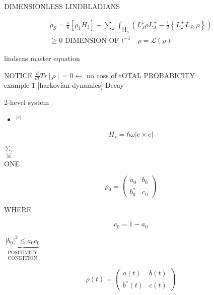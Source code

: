 \documentclass[10pt]{article}
\begin{document}
DIMENSIONLESS LINDBLADIANS

$$
\begin{array}{r}
\dot{\rho}_{S}=\frac{i}{\hbar}\left[\rho_{1} H_{3}\right]+\sum_{J} \int_{\prod_{S}}\left(L_{J}^{\downarrow} \rho L_{J}^{+}-\frac{1}{2}\left\{L_{J}^{+} L_{J}, \rho\right\}\right) \\
\geqslant 0 \text { DIMENSION OF } t^{-1} \quad \rho=\mathcal{L}(\rho)
\end{array}
$$

lindscas master equation

NOTICE $\frac{d}{d t} T r[\rho]=0 \leftarrow$ no coss of tOTAL PROBABICITY\\[0pt]
example 1 [harkovian dynamics] Decay

2-hevel system

\begin{itemize}
  \item ${ }^{|e\rangle}$
\end{itemize}

$$
H_{s}=\hbar \omega|e \times e|
$$

$\frac{\sum_{2}}{|y|}$\\
ONE

$$
\rho_{0}=\left(\begin{array}{ll}
a_{0} & b_{0} \\
b_{0}^{*} & c_{0}
\end{array}\right)
$$

WHERE

$$
c_{0}=1-a_{0}
$$

$\underbrace{\left|b_{0}\right|^{2} \leqslant a_{0} c_{0}}_{\substack{\text { POSITIVITY } \\ \text { CONDITION }}}$

$$
\rho(t)=\left(\begin{array}{ll}
a(t) & b(t) \\
b^{*}(t) & c(t)
\end{array}\right)
$$
\end{document}

